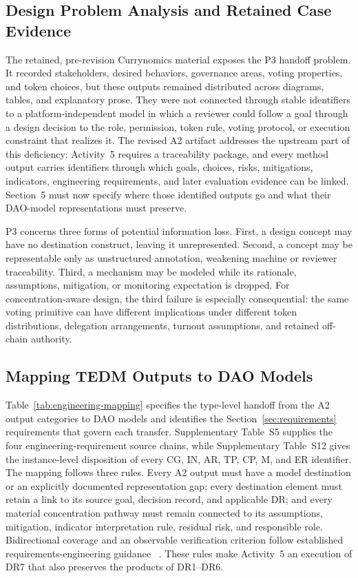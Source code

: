 \documentclass[referee,sn-basic]{sn-jnl}
\begin{document}
\subsection{Design Problem Analysis and Retained Case Evidence}\label{subsec:engineering-problem}

The retained, pre-revision Currynomics material exposes the P3 handoff problem.
It recorded stakeholders, desired behaviors, governance areas, voting
properties, and token choices, but these outputs remained distributed across
diagrams, tables, and explanatory prose. They were not connected through stable
identifiers to a platform-independent model in which a reviewer could follow a
goal through a design decision to the role, permission, token rule, voting
protocol, or execution constraint that realizes it. The revised A2 artifact
addresses the upstream part of this deficiency: Activity~5 requires a
traceability package, and every method output carries identifiers through which
goals, choices, risks, mitigations, indicators, engineering requirements, and
later evaluation evidence can be linked. Section~5 must now specify where those identified outputs go and what
their DAO-model representations must preserve.

P3 concerns three forms of potential information loss. First, a design concept
may have no destination construct, leaving it unrepresented. Second, a concept
may be representable only as unstructured annotation, weakening machine or
reviewer traceability. Third, a mechanism may be modeled while its rationale,
assumptions, mitigation, or monitoring expectation is dropped. For
concentration-aware design, the third failure is especially consequential: the
same voting primitive can have different implications under different token
distributions, delegation arrangements, turnout assumptions, and retained
off-chain authority.

\subsection{Mapping TEDM Outputs to DAO Models}\label{subsec:mapping}

Table~\ref{tab:engineering-mapping} specifies the type-level handoff from the A2
output categories to DAO models and identifies the Section~\ref{sec:requirements}
requirements that govern each transfer. Supplementary Table~S5 supplies the
four engineering-requirement source chains, while Supplementary Table~S12 gives
the instance-level disposition of every CG, IN, AR, TP, CP, M, and ER identifier.
The mapping
follows three rules. Every A2 output must have a model
destination or an explicitly documented representation gap; every destination
element must retain a link to its source goal, decision record, and applicable
DR; and every material concentration pathway must remain connected to its
assumptions, mitigation, indicator interpretation rule, residual risk, and
responsible role. Bidirectional coverage and an observable verification
criterion follow established requirements-engineering guidance
~\cite{ISO29148}. These rules make Activity~5 an execution of DR7 that also
preserves the products of DR1--DR6.
\end{document}
